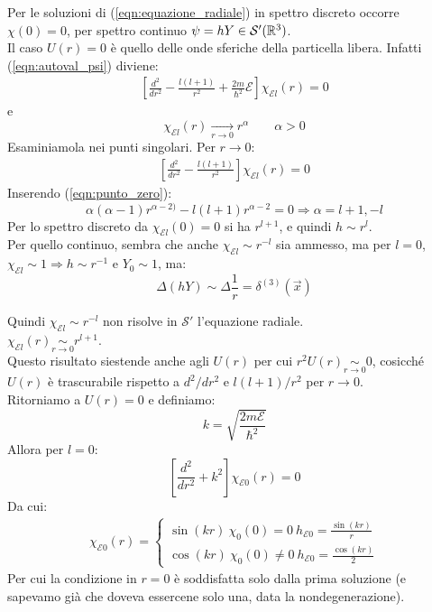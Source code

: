 \documentclass[../../FisicaTeorica.tex]{subfiles}
\begin{document}
Per le soluzioni di (\ref{eqn:equazione_radiale}) in spettro discreto occorre $\chi(0)=0$, per spettro continuo $\psi = h Y \in \mathcal{S}'(\mathbb{R}^3)$.\\
Il caso $U(r)=0$ è quello delle onde sferiche della particella libera. Infatti (\ref{eqn:autoval_psi}) diviene:
\begin{align*}
\left[\frac{d^2}{dr^2}-\frac{l(l+1)}{r^2} + \frac{2m}{\hbar^2}\mathcal{E}\right] \chi_{\mathcal{E}l}(r) = 0
\end{align*}
e 
\begin{equation}
\chi_{\mathcal{E}l}(r) \xrightarrow[r \to 0]{} r^\alpha \qquad \alpha > 0
\label{eqn:punto_zero}
\end{equation}
Esaminiamola nei punti singolari. Per $r \to 0$:
\begin{align}
\left[\frac{d^2}{dr^2}-\frac{l(l+1)}{r^2}\right] \chi_{\mathcal{E}l}(r)=0
\end{align}
Inserendo (\ref{eqn:punto_zero}):
\[
\alpha(\alpha -1 )r^{\alpha-2)} - l(l+1)r^{\alpha-2}=0 \Rightarrow  \alpha = l+1, -l
\]
Per lo spettro discreto da $\chi_{\mathcal{E}l}(0)=0$ si ha $r^{l+1}$, e quindi $h \sim r^l$.\\
Per quello continuo, sembra che anche $\chi_{\mathcal{E}l} \sim r^{-l}$ sia ammesso, ma per $l=0$, $\chi_{\mathcal{E}l} \sim 1 \Rightarrow h \sim r^{-1}$ e $Y_0 \sim 1$, ma:
\[
\Delta(hY)\sim \Delta \frac{1}{r} = \delta^{(3)}(\vec{x})
\]

Quindi $\chi_{\mathcal{E}l} \sim r^{-l}$ non risolve in $\mathcal{S}'$ l'equazione radiale.\\
$\chi_{\mathcal{E}l} (r) \underset{r \to 0}{\sim} r^{l+1}$.\\
Questo risultato siestende anche agli $U(r)$ per cui $r^2 U(r) \underset{r\to 0}{\sim} 0$, cosicché $U(r)$ è trascurabile rispetto a $d^2/dr^2$ e $l(l+1)/r^2$ per $r\to 0$.\\

Ritorniamo a $U(r)=0$ e definiamo:
\[
k = \sqrt{\frac{2m\mathcal{E}}{\hbar^2}}
\]
Allora per $l=0$:
\[
\left[\frac{d^2}{dr^2} + k^2 \right] \chi_{\mathcal{E}0} (r) = 0 
\]
Da cui:
\begin{align*}
\chi_{\mathcal{E}0}(r)=
\begin{cases}
\sin(k r) \> \chi_0(0) = 0 \> h_{\mathcal{E}0}=\frac{\sin(kr)}{r}\\
\cos(kr) \> \chi_0(0) \neq 0 \> h_{\mathcal{E}0} = \frac{\cos(kr)}{2}
\end{cases}
\end{align*}
Per cui la condizione in $r=0$ è soddisfatta solo dalla prima soluzione (e sapevamo già che doveva essercene solo una, data la nondegenerazione).\\
\end{document}
